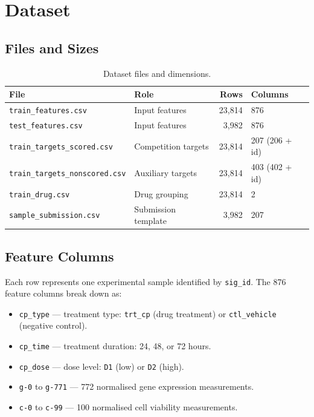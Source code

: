\documentclass[12pt, a4paper]{article}
\begin{document}
\section{Dataset}

\subsection{Files and Sizes}

\begin{table}[h!]
\centering
\caption{Dataset files and dimensions.}
\begin{tabular}{llrl}
\toprule
\textbf{File} & \textbf{Role} & \textbf{Rows} & \textbf{Columns} \\
\midrule
\texttt{train\_features.csv} & Input features & 23,814 & 876 \\
\texttt{test\_features.csv}  & Input features & 3,982  & 876 \\
\texttt{train\_targets\_scored.csv} & Competition targets & 23,814 & 207 (206 + id) \\
\texttt{train\_targets\_nonscored.csv} & Auxiliary targets & 23,814 & 403 (402 + id) \\
\texttt{train\_drug.csv} & Drug grouping & 23,814 & 2 \\
\texttt{sample\_submission.csv} & Submission template & 3,982 & 207 \\
\bottomrule
\end{tabular}
\end{table}

\subsection{Feature Columns}

Each row represents one experimental sample identified by \texttt{sig\_id}. The 876 feature columns break down as:

\begin{itemize}[noitemsep]
    \item \texttt{cp\_type} — treatment type: \texttt{trt\_cp} (drug treatment) or \texttt{ctl\_vehicle} (negative control).
    \item \texttt{cp\_time} — treatment duration: 24, 48, or 72 hours.
    \item \texttt{cp\_dose} — dose level: \texttt{D1} (low) or \texttt{D2} (high).
    \item \texttt{g-0} to \texttt{g-771} — 772 normalised gene expression measurements.
    \item \texttt{c-0} to \texttt{c-99} — 100 normalised cell viability measurements.
\end{itemize}
\end{document}

